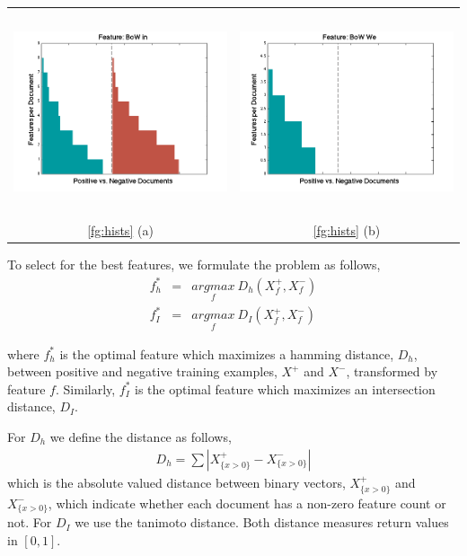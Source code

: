 \begin{center}
\begin{tabular}{@{}cc@{}}
\label{fg:hists}
\includegraphics[height=60mm]{figs/features/bad_feature} &
\includegraphics[height=60mm]{figs/features/great_feature} \\
\ref{fg:hists} (a)  & \ref{fg:hists} (b) \\
\end{tabular}
\end{center}

To select for the best features, we formulate the problem as follows,
\begin{eqnarray}
f^{*}_{h} &=& \underset{f}{argmax}\ D_{h}(X^{+}_{f}, X^{-}_{f})\\
f^{*}_{I} &=& \underset{f}{argmax}\ D_{I}(X^{+}_{f}, X^{-}_{f})
\end{eqnarray}

where $f^{*}_{h}$ is the optimal feature which maximizes a hamming distance, $D_h$, between positive and negative training examples, $X^{+}$ and $X^{-}$, transformed by feature $f$. Similarly, $f^{*}_{I}$ is the optimal feature which maximizes an intersection distance, $D_{I}$. 

For $D_{h}$ we define the distance as follows,
\begin{eqnarray}
D_h = \sum |X^{+}_{\{x>0\}} - X^{-}_{\{x>0\}}|
\end{eqnarray}
which is the absolute valued distance between binary vectors, $X^{+}_{\{x>0\}}$ and  $X^{-}_{\{x>0\}}$,  which indicate whether each document has a non-zero feature count or not.
For $D_{I}$ we use the tanimoto distance. Both distance measures return values in $[ 0, 1 ]$.

